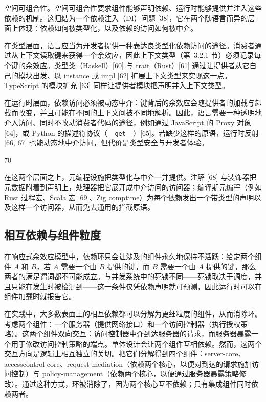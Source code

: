 \documentclass[
  10
]{article}
\begin{document}
空间可组合性。空间可组合性要求组件能够声明依赖、运行时能够提供并注入这些依赖的机制。这归结为一个依赖注入（DI）问题 {[}38{]}，它在两个随语言而异的层面上体现：依赖如何被类型化，以及依赖的访问如何被中介。

在类型层面，语言应当为开发者提供一种表达良类型化依赖访问的途径。消费者通过从上下文读取键来获得一个余效应，因此上下文类型（第~3.2.1 节）必须记录每个键的余效应。类型类（Haskell）{[}60{]} 与 trait（Rust）{[}61{]} 通过让提供者从它自己的模块出发、以 instance 或 impl {[}62{]} 扩展上下文类型来实现这一点。TypeScript 的模块扩充 {[}63{]} 同样让提供者模块把声明并入上下文类型。

在运行时层面，依赖访问必须被动态中介：键背后的余效应会随提供者的加载与卸载而改变，并且可能在不同的上下文间被不同地解析。因此，语言需要一种透明地介入访问、同时不改动消费者代码的途径，例如通过 JavaScript 的 Proxy 对象 {[}64{]}，或 Python 的描述符协议（\texttt{\_\_get\_\_}）{[}65{]}。若缺少这样的原语，运行时反射 {[}66, 67{]} 也能动态地中介访问，但代价是类型安全与开发者体验。

70

在这两个层面之上，元编程设施把类型化与中介一并提供。注解 {[}68{]} 与装饰器把元数据附着到声明上，处理器把它展开成中介访问的访问器；编译期元编程（例如 Rust 过程宏、Scala 宏 {[}69{]}、Zig comptime）为每个依赖发出一个带类型的声明以及这样一个访问器，从而免去通用的拦截原语。

\subsection{相互依赖与组件粒度} \label{mutual-dependencies-and-component-granularity}

在响应式余效应模型中，依赖环只会让涉及的组件永久地保持不活跃：给定两个组件 \(A\) 和 \(B\)，若 \(A\) 需要一个由 \(B\) 提供的键，而 \(B\) 需要一个由 \(A\) 提供的键，那么两者的满足谓词都不可能成立。与并发系统中的死锁不同——死锁取决于调度，并且只能在发生时被检测到——这一条件仅凭依赖声明就可预测，因此运行时可以在组件加载时就报告它。

在实践中，大多数表面上的相互依赖都可以分解为更细粒度的组件，从而消除环。考虑两个组件：一个服务器（提供网络接口）和一个访问控制器（执行授权策略）。这两个组件双向交互：访问控制器中介到达服务器的请求，而服务器暴露一个用于修改访问控制策略的端点。单体设计会让两个组件互相依赖。然而，这两个交互方向是逻辑上相互独立的关切。把它们分解得到四个组件：server-core、accesscontrol-core、request-mediation（依赖两个核心，以便对到达的请求施加访问控制）与 policy-management（依赖两个核心，以便通过服务器暴露策略修改）。通过这种方式，环被消除了，因为两个核心互不依赖；只有集成组件同时依赖两者。
\end{document}
